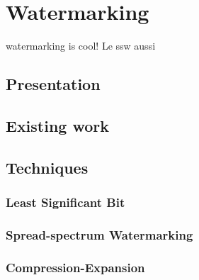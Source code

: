 \chapter{Watermarking}
\Gls{watermarking} is cool! Le ssw aussi\cite{cox1997secure}
\section{Presentation}
\section{Existing work}
\section{Techniques}
\subsection{Least Significant Bit}
\subsection{Spread-spectrum Watermarking}
\subsection{Compression-Expansion}
